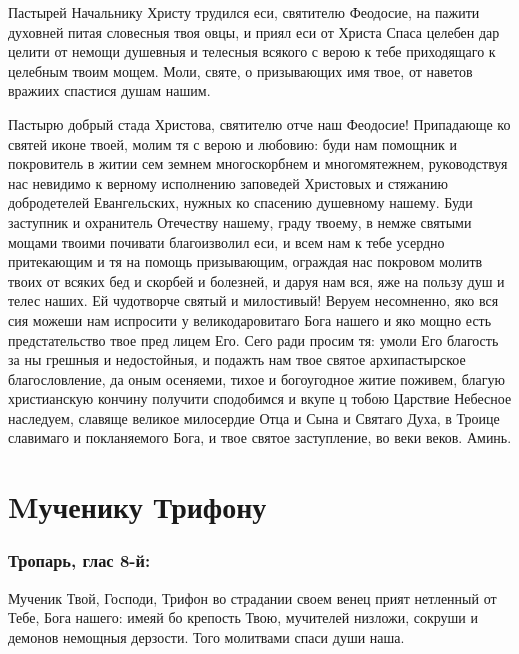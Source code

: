 

Пастырей Начальнику Христу трудился еси, святителю Феодосие, на пажити духовней питая словесныя твоя овцы, и приял еси от Христа Спаса целебен дар целити от немощи душевныя и телесныя всякого с верою к тебе приходящаго к целебным твоим мощем. Моли, святе, о призывающих имя твое, от наветов вражиих спастися душам нашим.




Пастырю добрый стада Христова, святителю отче наш Феодосие! Припадающе ко святей иконе твоей, молим тя с верою и любовию: буди нам помощник и покровитель в житии сем земнем многоскорбнем и многомятежнем, руководствуя нас невидимо к верному исполнению заповедей Христовых и стяжанию добродетелей Евангельских, нужных ко спасению душевному нашему. Буди заступник и охранитель Отечеству нашему, граду твоему, в немже святыми мощами твоими почивати благоизволил еси, и всем нам к тебе усердно притекающим и тя на помощь призывающим, ограждая нас покровом молитв твоих от всяких бед и скорбей и болезней, и даруя нам вся, яже на пользу душ и телес наших. Ей чудотворче святый и милостивый! Веруем несомненно, яко вся сия можеши нам испросити  у великодаровитаго Бога нашего и яко мощно есть предстательство твое пред лицем Его. Сего ради просим тя: умоли Его благость за ны грешныя и недостойныя, и подажть нам твое святое архипастырское благословление, да оным осеняеми, тихое и богоугодное житие поживем, благую христианскую кончину получити сподобимся и вкупе ц тобою Царствие Небесное наследуем, славяще великое милосердие Отца и Сына и Святаго Духа, в Троице славимаго и покланяемого Бога, и твое святое заступление, во веки веков. Аминь.


\section{Mученику Трифону}
 



\subsubsection{Тропарь, глас 8-й:}


Мученик Твой, Господи, Трифон во страдании своем венец прият нетленный от Тебе, Бога нашего: имеяй бо крепость Твою, мучителей низложи, сокруши и демонов немощныя дерзости. Того молитвами спаси души наша.


